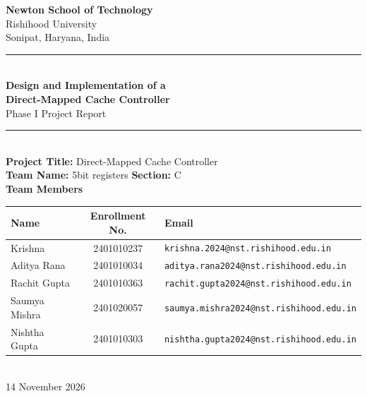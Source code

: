 \documentclass[conference,a4paper]{IEEEtran}
\begin{document}
\onecolumn
\pagestyle{empty}
\begin{center}
\vspace*{0.6cm}
{\Large\bfseries Newton School of Technology}\\[3pt]
{\large Rishihood University}\\[2pt]
{\normalsize Sonipat, Haryana, India}\\[0.5cm]
\rule{\textwidth}{0.8pt}\\[0.9cm]
{\LARGE\bfseries Design and Implementation of a\\[4pt] Direct-Mapped Cache Controller}\\[0.7cm]
{\large Phase I Project Report}\\[0.9cm]
\rule{0.5\textwidth}{0.4pt}\\[0.7cm]
{\large\textbf{Project Title:} Direct-Mapped Cache Controller}\\[6pt]
{\large\textbf{Team Name:} 5bit registers \qquad \textbf{Section:} C}\\[1.0cm]
{\large\bfseries Team Members}\\[0.4cm]
\renewcommand{\arraystretch}{1.7}
\begin{tabular}{|l|c|l|}
\hline
\textbf{Name} & \textbf{Enrollment No.} & \textbf{Email}\\ \hline
Krishna & 2401010237 & \texttt{krishna.2024@nst.rishihood.edu.in}\\ \hline
Aditya Rana & 2401010034 & \texttt{aditya.rana2024@nst.rishihood.edu.in}\\ \hline
Rachit Gupta & 2401010363 & \texttt{rachit.gupta2024@nst.rishihood.edu.in}\\ \hline
Saumya Mishra & 2401020057 & \texttt{saumya.mishra2024@nst.rishihood.edu.in}\\ \hline
Nishtha Gupta & 2401010303 & \texttt{nishtha.gupta2024@nst.rishihood.edu.in}\\ \hline
\end{tabular}\\[1.2cm]
{\large 14 November 2026}
\end{center}
\clearpage
\end{document}
